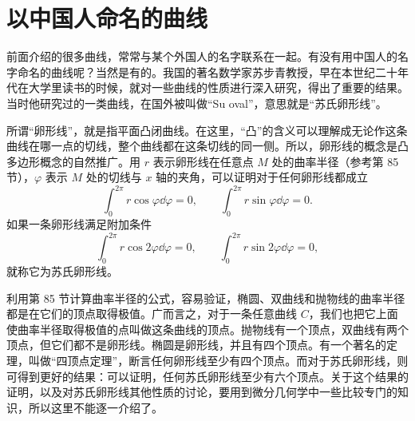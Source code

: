 \section{以中国人命名的曲线}

前面介绍的很多曲线，常常与某个外国人的名字联系在一起。有没有用中国人的名字命名的曲线呢？当然是有的。我国的著名数学家苏步青教授，早在本世纪二十年代在大学里读书的时候，就对一些曲线的性质进行深入研究，得出了重要的结果。当时他研究过的一类曲线，在国外被叫做“Su oval”，意思就是“苏氏卵形线”。

所谓“卵形线”，就是指平面凸闭曲线。在这里，“凸”的含义可以理解成无论作这条曲线在哪一点的切线，整个曲线都在这条切线的同一侧。所以，卵形线的概念是凸多边形概念的自然推广。用 $r$ 表示卵形线在任意点 $M$ 处的曲率半径（参考第 85 节），$\varphi$ 表示 $M$ 处的切线与 $x$ 轴的夹角，可以证明对于任何卵形线都成立
\[
  \int_0^{2\pi} r \cos\varphi \dd\varphi = 0, \qquad \int_0^{2\pi} r \sin\varphi \dd\varphi = 0.
\]
如果一条卵形线满足附加条件
\[
  \int_0^{2\pi} r \cos 2\varphi \dd\varphi = 0, \qquad \int_0^{2\pi} r \sin 2\varphi \dd\varphi = 0,
\]
就称它为苏氏卵形线。

利用第 85 节计算曲率半径的公式，容易验证，椭圆、双曲线和抛物线的曲率半径都是在它们的顶点取得极值。广而言之，对于一条任意曲线 $C$，我们也把它上面使曲率半径取得极值的点叫做这条曲线的顶点。抛物线有一个顶点，双曲线有两个顶点，但它们都不是卵形线。椭圆是卵形线，并且有四个顶点。有一个著名的定理，叫做“四顶点定理”，断言任何卵形线至少有四个顶点。而对于苏氏卵形线，则可得到更好的结果：可以证明，任何苏氏卵形线至少有六个顶点。关于这个结果的证明，以及对苏氏卵形线其他性质的讨论，要用到微分几何学中一些比较专门的知识，所以这里不能逐一介绍了。
